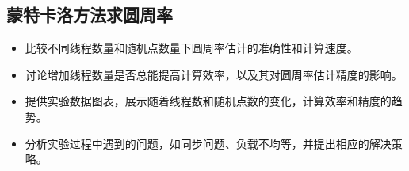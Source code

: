 \subsection{蒙特卡洛方法求圆周率}
\begin{itemize}
\item 比较不同线程数量和随机点数量下圆周率估计的准确性和计算速度。
    \item 讨论增加线程数量是否总能提高计算效率，以及其对圆周率估计精度的影响。
    \item 提供实验数据图表，展示随着线程数和随机点数的变化，计算效率和精度的趋势。
    \item 分析实验过程中遇到的问题，如同步问题、负载不均等，并提出相应的解决策略。
\end{itemize}
